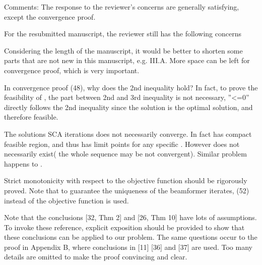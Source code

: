 Comments:
The response to the reviewer's concerns are generally satisfying, except the convergence proof.

\vspace{0.1in}

For the resubmitted manuscript, the reviewer still has the following concerns

\begin{enumerate}
 Considering the length of the manuscript, it would be better to shorten some parts that are not new in this manuscript, e.g. III.A. More space can be left for convergence proof, which is very important. 

\resp {}

 In convergence proof (48), why does the 2nd inequality hold? In fact, to prove the feasibility of  , the part between 2nd and 3rd inequality is not necessary, ''<=0'' directly follows the 2nd inequality since the solution  is the optimal solution, and therefore  feasible.  

\resp \review{
	}

 The solutions SCA iterations  does not necessarily converge. In fact  has compact feasible region, and thus  has limit points for any specific .  However  does not necessarily exist( the whole sequence  may be not convergent). Similar problem happens to . 

\resp \review {	
}

 Strict monotonicity with respect to the objective function  should be rigorously proved. Note that to guarantee the uniqueness of the beamformer iterates, (52) instead of the objective function is used. 

\resp \review{}

 Note that the conclusions [32, Thm 2] and [26, Thm 10] have lots of assumptions. To invoke these reference, explicit exposition should be provided to show that these conclusions can be applied to our problem. The same questions occur to the proof in Appendix B, where conclusions in [11] [36] and [37] are used. Too many details are omitted to make the proof convincing and clear. 

\resp \review{}

\end{enumerate}
